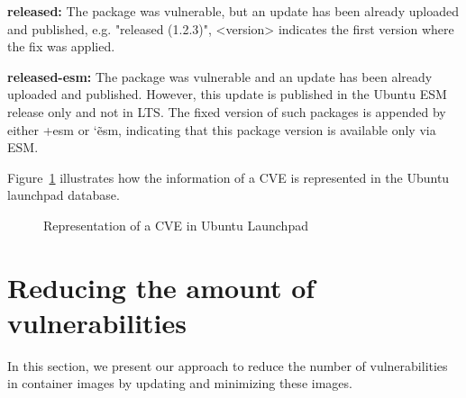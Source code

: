 \documentclass[a4paper,num-refs]{oup-contemporary}
\begin{document}
\textbf{released:} The package was vulnerable, but
		an update has been already uploaded and published, e.g. "released (1.2.3)",
		<version> indicates the first version where the fix was applied.

\textbf{released-esm:} The package was vulnerable and
		an update has been already uploaded and published. However,
		this update is published in the Ubuntu ESM release only and not in LTS.
		The fixed version of such packages is appended by either
		+esm or \char`\~esm, indicating that this package version is available
		only via ESM.

Figure~\ref{example} illustrates how the information of a CVE is represented
in the Ubuntu launchpad database.

\begin{figure}[!ht]
        \caption{\label{example} Representation of a CVE in Ubuntu Launchpad}
\end{figure}
\vspace*{-7mm}
\section{Reducing the amount of vulnerabilities}

In this section, we present our approach to reduce the number of
vulnerabilities in container images  by updating and minimizing these
images.
\vspace*{-2mm}
\end{document}
